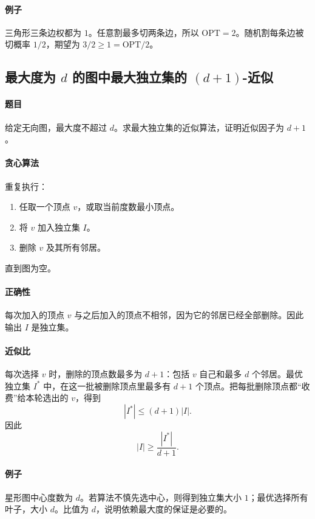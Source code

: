 \documentclass[UTF8,openany,12pt]{ctexbook}
\theoremstyle{remark}
\newcommand{\OPT}{\mathrm{OPT}}
\begin{document}
\paragraph{例子}
三角形三条边权都为 $1$。任意割最多切两条边，所以 $\OPT=2$。随机割每条边被切概率
$1/2$，期望为 $3/2\ge1=\OPT/2$。

\subsection[最大度为 d 的图中最大独立集的 d+1 近似]{最大度为 $d$ 的图中最大独立集的 $(d+1)$-近似}

\paragraph{题目}
给定无向图，最大度不超过 $d$。求最大独立集的近似算法，证明近似因子为 $d+1$。

\paragraph{贪心算法}
重复执行：
\begin{enumerate}
  \item 任取一个顶点 $v$，或取当前度数最小顶点。
  \item 将 $v$ 加入独立集 $I$。
  \item 删除 $v$ 及其所有邻居。
\end{enumerate}
直到图为空。

\paragraph{正确性}
每次加入的顶点 $v$ 与之后加入的顶点不相邻，因为它的邻居已经全部删除。因此输出 $I$ 是独立集。

\paragraph{近似比}
每次选择 $v$ 时，删除的顶点数最多为 $d+1$：包括 $v$ 自己和最多 $d$ 个邻居。最优独立集
$I^*$ 中，在这一批被删除顶点里最多有 $d+1$ 个顶点。把每批删除顶点都“收费”给本轮选出的
$v$，得到
\[
  |I^*|\le (d+1)|I|.
\]
因此
\[
  |I|\ge \frac{|I^*|}{d+1}.
\]

\paragraph{例子}
星形图中心度数为 $d$。若算法不慎先选中心，则得到独立集大小 $1$；最优选择所有叶子，大小
$d$。比值为 $d$，说明依赖最大度的保证是必要的。
\end{document}
